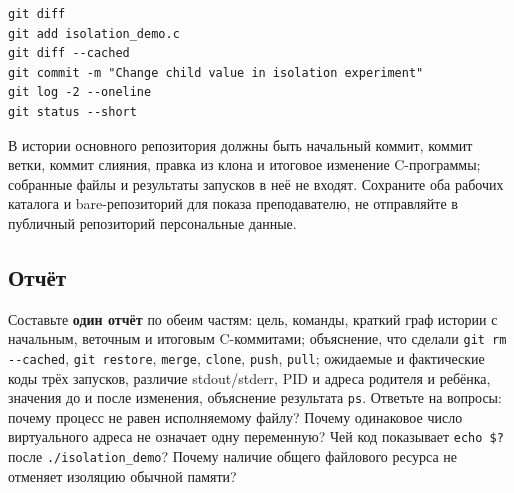 \begin{verbatim}
git diff
git add isolation_demo.c
git diff --cached
git commit -m "Change child value in isolation experiment"
git log -2 --oneline
git status --short
\end{verbatim}

В истории основного репозитория должны быть начальный коммит, коммит
ветки, коммит слияния, правка из клона и итоговое изменение C-программы;
собранные файлы и результаты запусков в неё не входят. Сохраните оба
рабочих каталога и bare-репозиторий для показа
преподавателю, не отправляйте в публичный репозиторий персональные данные.

\subsection{Отчёт}

Составьте \textbf{один отчёт} по обеим частям: цель, команды,
краткий граф истории с начальным, веточным и итоговым C-коммитами;
объяснение, что сделали \texttt{git rm -{}-cached},
\texttt{git restore}, \texttt{merge}, \texttt{clone}, \texttt{push},
\texttt{pull}; ожидаемые и фактические коды трёх запусков,
различие stdout/stderr, PID и адреса родителя и ребёнка, значения до и
после изменения, объяснение результата \texttt{ps}. Ответьте на вопросы:
почему процесс не равен исполняемому файлу? Почему одинаковое число
виртуального адреса не означает одну переменную? Чей код показывает
\texttt{echo \$?} после \texttt{./isolation\_demo}? Почему наличие
общего файлового ресурса не отменяет изоляцию обычной памяти?
